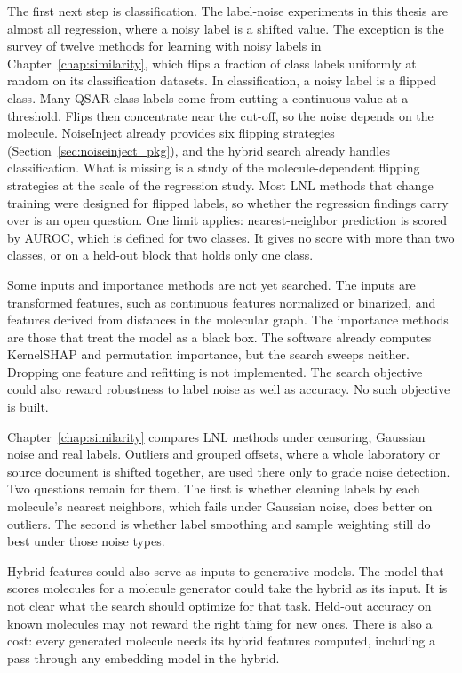 The first next step is classification. The label-noise experiments in this thesis are almost all regression, where a noisy label is a shifted value. The exception is the survey of twelve methods for learning with noisy labels in Chapter~\ref{chap:similarity}, which flips a fraction of class labels uniformly at random on its classification datasets. In classification, a noisy label is a flipped class. Many QSAR class labels come from cutting a continuous value at a threshold. Flips then concentrate near the cut-off, so the noise depends on the molecule. NoiseInject already provides six flipping strategies (Section~\ref{sec:noiseinject_pkg}), and the hybrid search already handles classification. What is missing is a study of the molecule-dependent flipping strategies at the scale of the regression study. Most LNL methods that change training were designed for flipped labels, so whether the regression findings carry over is an open question. One limit applies: nearest-neighbor prediction is scored by AUROC, which is defined for two classes. It gives no score with more than two classes, or on a held-out block that holds only one class.

Some inputs and importance methods are not yet searched. The inputs are transformed features, such as continuous features normalized or binarized, and features derived from distances in the molecular graph. The importance methods are those that treat the model as a black box. The software already computes KernelSHAP and permutation importance, but the search sweeps neither. Dropping one feature and refitting is not implemented. The search objective could also reward robustness to label noise as well as accuracy. No such objective is built.

Chapter~\ref{chap:similarity} compares LNL methods under censoring, Gaussian noise and real labels. Outliers and grouped offsets, where a whole laboratory or source document is shifted together, are used there only to grade noise detection. Two questions remain for them. The first is whether cleaning labels by each molecule's nearest neighbors, which fails under Gaussian noise, does better on outliers. The second is whether label smoothing and sample weighting still do best under those noise types.

Hybrid features could also serve as inputs to generative models. The model that scores molecules for a molecule generator could take the hybrid as its input. It is not clear what the search should optimize for that task. Held-out accuracy on known molecules may not reward the right thing for new ones. There is also a cost: every generated molecule needs its hybrid features computed, including a pass through any embedding model in the hybrid.

